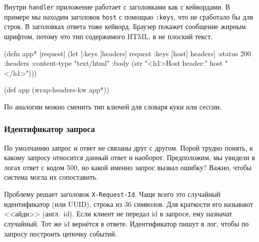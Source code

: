 \fi

Внутри \verb|handler| приложение работает с заголовками как с кейвордами. В
примере мы находим заголовок \verb|host| с помощью \verb|:keys|, что не
сработало бы для строк. В заголовках ответа тоже кейворд. Браузер покажет
сообщение жирным шрифтом, потому что тип содержимого HTML, в не плоский текст.

\ifnarrow

\begin{english}
  \begin{clojure}
(defn app* [request]
  (let [{:keys [headers]} request
        {:keys [host]} headers]
    {:status 200
     :headers {:content-type "text/html"}
     :body (str "<h1>Host header:" host
                "</h1>")}))

(def app (wrap-headers-kw app*))
  \end{clojure}
\end{english}

\else

\begin{english}
\end{english}

\fi

По аналогии можно сменить тип ключей для словаря куки или сессии.

\subsubsection*{Идентификатор запроса}


По умолчанию запрос и ответ не связаны друг с другом. Порой трудно понять, к
какому запросу относится данный ответ и наоборот. Предположим, мы увидели в
логах ответ с кодом 500, но какой именно запрос вызвал ошибку? Важно, чтобы
система могла их сопоставить.

Проблему решает заголовок \verb|X-Request-Id|. Чаще всего это случайный
идентификатор (или UUID), строка из 36 символов. Для краткости его называют
<<айди>> (англ.~id). Если клиент не передал id в запросе, ему назначат
случайный. Тот же id вернётся в ответе. Идентификатор пишут в лог, чтобы по
запросу построить цепочку событий.

